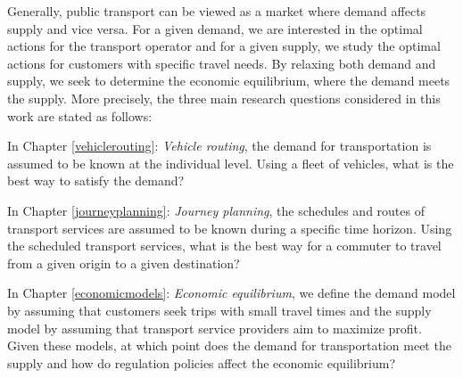 \documentclass[dissertation,draft*]{aaltoseries}
\begin{document}
Generally, public transport can be viewed as a market where demand affects supply and vice versa.
For a given demand, we are interested in the optimal actions for the transport operator and for a given supply, 
we study the optimal actions for customers with specific travel needs. By relaxing both demand and supply, 
we seek to determine the economic equilibrium, where the demand meets the supply.
More precisely, the three main research questions considered in this work are stated as follows: 

In Chapter \ref{vehiclerouting}: \emph{Vehicle routing}, the demand for transportation is assumed to be known at the individual level. 
Using a fleet of vehicles, what is the best way to satisfy the demand? 

In Chapter \ref{journeyplanning}: \emph{Journey planning}, the schedules and routes of transport services are assumed to be known during a specific time horizon.
Using the scheduled transport services, what is the best way for a commuter to travel from a given origin to a given destination?

In Chapter \ref{economicmodels}: \emph{Economic equilibrium}, we define the demand model by assuming that customers seek trips with
small travel times and the supply model by assuming that transport service providers aim to maximize profit. Given these models,
at which point does the demand for transportation meet the supply and how do regulation policies affect the economic equilibrium?

% 
% 
% 
%    
\end{document}
